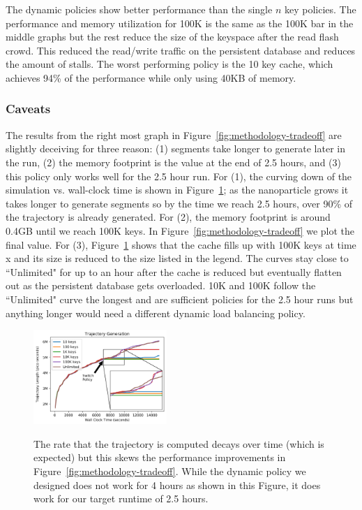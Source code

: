 The dynamic policies show better performance than the single \(n\) key
policies. The performance and memory utilization for 100K is the same as the
100K bar in the middle graphs but the rest reduce the size of the keyspace
after the read flash crowd. This reduced the read/write traffic on the
persistent database and reduces the amount of stalls.  The worst performing
policy is the 10 key cache, which achieves 94\% of the performance while only
using 40KB of memory. 

\subsubsection*{Caveats}

The results from the right most graph in Figure~\ref{fig:methodology-tradeoff}
are slightly deceiving for three reason: (1) segments take longer to generate
later in the run, (2) the memory footprint is the value at the end of 2.5
hours, and (3) this policy only works well for the 2.5 hour run.  For (1), the
curving down of the simulation vs. wall-clock time is shown in
Figure~\ref{fig:methodology-trajectory}; as the nanoparticle grows it takes
longer to generate segments so by the time we reach 2.5 hours, over 90\% of the
trajectory is already generated.  For (2), the memory footprint is around 0.4GB
until we reach 100K keys. In Figure~\ref{fig:methodology-tradeoff} we plot the
final value. For (3), Figure~\ref{fig:methodology-trajectory} shows that the
cache fills up with 100K keys at time x and its size is reduced to the size
listed in the legend.  The curves stay close to ``Unlimited" for up to an hour
after the cache is reduced but eventually flatten out as the persistent
database gets overloaded. 10K and 100K follow the ``Unlimited" curve the
longest and are sufficient policies for the 2.5 hour runs but anything longer
would need a different dynamic load balancing policy.

\begin{figure}[tbh]
  \noindent\includegraphics[width=0.45\textwidth]{figures/methodology-trajectory.png}\\
  \caption{The rate that the trajectory is computed decays over time (which is
  expected) but this skews the performance improvements in
  Figure~\ref{fig:methodology-tradeoff}. While the dynamic policy we designed
  does not work for 4 hours as shown in this Figure, it does work for our target
  runtime of 2.5 hours. \label{fig:methodology-trajectory}}
\end{figure}

